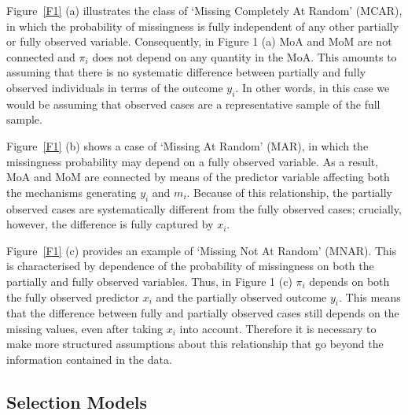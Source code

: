 \documentclass[]{article}
\begin{document}
Figure~\ref{F1} (a) illustrates the class of `Missing Completely At Random'
(MCAR), in which the probability of missingness is fully independent of
any other partially or fully observed variable. Consequently, in Figure
1 (a) MoA and MoM are not connected and \(\pi_{i}\) does not depend on
any quantity in the MoA. This amounts to assuming that there is no
systematic difference between partially and fully observed individuals
in terms of the outcome \(y_{i}\). In other words, in this case we would
be assuming that observed cases are a representative sample of the full
sample.

Figure~\ref{F1} (b) shows a case of `Missing At Random' (MAR), in which the
missingness probability may depend on a fully observed variable. As a
result, MoA and MoM are connected by means of the predictor variable
affecting both the mechanisms generating \(y_{i}\) and \(m_{i}\).
Because of this relationship, the partially observed cases are
systematically different from the fully observed cases; crucially,
however, the difference is fully captured by \(x_{i}\).

Figure~\ref{F1} (c) provides an example of `Missing Not At Random' (MNAR). This
is characterised by dependence of the probability of missingness on both
the partially and fully observed variables. Thus, in Figure 1 (c)
\(\pi_{i}\) depends on both the fully observed predictor \(x_{i}\) and
the partially observed outcome \(y_{i}\). This means that the difference
between fully and partially observed cases still depends on the missing
values, even after taking \(x_{i}\) into account. Therefore it is
necessary to make more structured assumptions about this relationship
that go beyond the information contained in the data.

\subsection{Selection Models}\label{selection-models}
\end{document}
